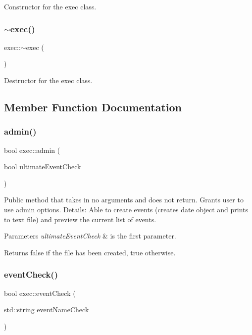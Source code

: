 Constructor for the exec class. \mbox{\label{classexec_a663a64f17c5431dc01a829f5633e4f56}} 
\subsubsection{\texorpdfstring{$\sim$exec()}{~exec()}}
{\footnotesize\ttfamily exec\+::$\sim$exec (\begin{DoxyParamCaption}{ }\end{DoxyParamCaption})}

Destructor for the exec class. 

\subsection{Member Function Documentation}
\mbox{\label{classexec_ab114315e1bb0daff8f96dc03e7c88392}} 
\subsubsection{\texorpdfstring{admin()}{admin()}}
{\footnotesize\ttfamily bool exec\+::admin (\begin{DoxyParamCaption}\item[{bool}]{ultimate\+Event\+Check }\end{DoxyParamCaption})}

Public method that takes in no arguments and does not return. Grants user to use admin options. Details\+: Able to create events (creates date object and prints to text file) and preview the current list of events. 
\begin{DoxyParams}{Parameters}
{\em ultimate\+Event\+Check} & is the first parameter. \\
\hline
\end{DoxyParams}
\begin{DoxyReturn}{Returns}
false if the file has been created, true otherwise. 
\end{DoxyReturn}
\mbox{\label{classexec_abf1c735a300deae3f5de4bf6891f2190}} 
\subsubsection{\texorpdfstring{event\+Check()}{eventCheck()}}
{\footnotesize\ttfamily bool exec\+::event\+Check (\begin{DoxyParamCaption}\item[{std\+::string}]{event\+Name\+Check }\end{DoxyParamCaption})}

